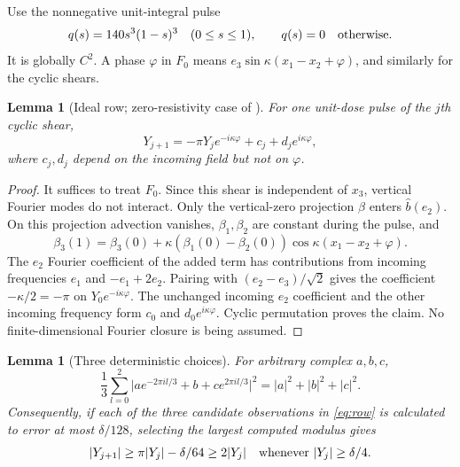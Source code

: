 \documentclass[11pt,a4paper]{amsart}
\newtheorem{lemma}[theorem]{Lemma}
\theoremstyle{definition}
\theoremstyle{remark}
\numberwithin{equation}{section}
\newcommand{\abs}[1]{\lvert #1\rvert}
\begin{document}
Use the nonnegative unit-integral pulse
\begin{equation}\label{eq:bump}
 q(s)=140s^3(1-s)^3\quad(0\le s\le1),
 \qquad q(s)=0\quad\hbox{otherwise}.
\end{equation}
It is globally $C^2$. A phase $\varphi$ in $F_0$ means $e_3\sin\kappa(x_1-x_2+\varphi)$, and similarly for the cyclic shears.

\begin{lemma}[Ideal row; zero-resistivity case of \cite{Rowan}]\label{lem:row}
For one unit-dose pulse of the $j$th cyclic shear,
\begin{equation}\label{eq:row}
 Y_{j+1}=-\pi Y_j e^{-i\kappa\varphi}+c_j+d_j e^{i\kappa\varphi},
\end{equation}
where $c_j,d_j$ depend on the incoming field but not on $\varphi$.
\end{lemma}

\begin{proof}
It suffices to treat $F_0$. Since this shear is independent of $x_3$, vertical Fourier modes do not interact. Only the vertical-zero projection $\beta$ enters $\widehat b(e_2)$. On this projection advection vanishes, $\beta_1,\beta_2$ are constant during the pulse, and
\[
 \beta_3(1)=\beta_3(0)+\kappa(\beta_1(0)-\beta_2(0))
 \cos\kappa(x_1-x_2+\varphi).
\]
The $e_2$ Fourier coefficient of the added term has contributions from incoming frequencies $e_1$ and $-e_1+2e_2$. Pairing with $(e_2-e_3)/\sqrt2$ gives the coefficient $-\kappa/2=-\pi$ on $Y_0e^{-i\kappa\varphi}$. The unchanged incoming $e_2$ coefficient and the other incoming frequency form $c_0$ and $d_0e^{i\kappa\varphi}$. Cyclic permutation proves the claim. No finite-dimensional Fourier closure is being assumed.
\end{proof}

\begin{lemma}[Three deterministic choices]\label{lem:phases}
For arbitrary complex $a,b,c$,
\begin{equation}\label{eq:threephase}
 \frac13\sum_{l=0}^2
 \abs{ae^{-2\pi il/3}+b+ce^{2\pi il/3}}^2
 =|a|^2+|b|^2+|c|^2.
\end{equation}
Consequently, if each of the three candidate observations in \eqref{eq:row} is calculated to error at most $\delta/128$, selecting the largest computed modulus gives
\begin{equation}\label{eq:double}
 |Y_{j+1}|\ge\pi|Y_j|-\delta/64\ge2|Y_j|
 \quad\hbox{whenever }|Y_j|\ge\delta/4.
\end{equation}
\end{lemma}
\end{document}
